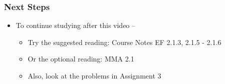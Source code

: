 \documentclass[10pt,english,aspectratio=169]{beamer}
\begin{document}
\begin{frame} \frametitle{Next Steps}

\begin{itemize}
\setlength\itemsep{5mm}
\item To continue studying after this video -- \vspace{2mm}

\begin{itemize}
 \setlength\itemsep{3mm}
 \item Try the suggested reading: Course Notes EF 2.1.3, 2.1.5 - 2.1.6
 \item Or the optional reading: MMA 2.1
 \item Also, look at the problems in Assignment 3
\end{itemize}
\end{itemize}


\end{frame}
\end{document}
